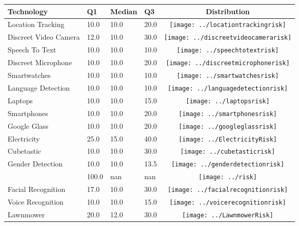 \begin{table}[t]
\begin{center}
\small
\begin{tabular}{| p{2cm} | p{1cm} | p{1cm} | p{1cm} | c |}
\hline
Technology & Q1 &  Median & Q3 & Distribution  \\ 
\hline
Location Tracking & 10.0 & 10.0 & 20.0 & \texttt{[image: ../locationtrackingrisk]} \\ 
Discreet Video Camera & 12.0 & 10.0 & 30.0 & \texttt{[image: ../discreetvideocamerarisk]} \\ 
Speech To Text & 10.0 & 10.0 & 10.0 & \texttt{[image: ../speechtotextrisk]} \\ 
Discreet Microphone & 10.0 & 10.0 & 20.0 & \texttt{[image: ../discreetmicrophonerisk]} \\ 
Smartwatches & 10.0 & 10.0 & 10.0 & \texttt{[image: ../smartwatchesrisk]} \\ 
Language Detection & 10.0 & 10.0 & 10.0 & \texttt{[image: ../languagedetectionrisk]} \\ 
Laptops & 10.0 & 10.0 & 15.0 & \texttt{[image: ../laptopsrisk]} \\ 
Smartphones & 10.0 & 10.0 & 20.0 & \texttt{[image: ../smartphonesrisk]} \\ 
Google Glass & 10.0 & 10.0 & 20.0 & \texttt{[image: ../googleglassrisk]} \\ 
Electricity & 25.0 & 15.0 & 40.0 & \texttt{[image: ../ElectricityRisk]} \\ 
Cubetastic & 10.0 & 10.0 & 30.0 & \texttt{[image: ../cubetasticrisk]} \\ 
Gender Detection & 10.0 & 10.0 & 13.5 & \texttt{[image: ../genderdetectionrisk]} \\ 
 & 100.0 & nan & nan & \texttt{[image: ../risk]} \\ 
Facial Recognition & 17.0 & 10.0 & 30.0 & \texttt{[image: ../facialrecognitionrisk]} \\ 
Voice Recognition & 10.0 & 10.0 & 15.0 & \texttt{[image: ../voicerecognitionrisk]} \\ 
Lawnmower & 20.0 & 12.0 & 30.0 & \texttt{[image: ../LawnmowerRisk]} \\ 

\end{tabular}
\end{center}
\end{table}
